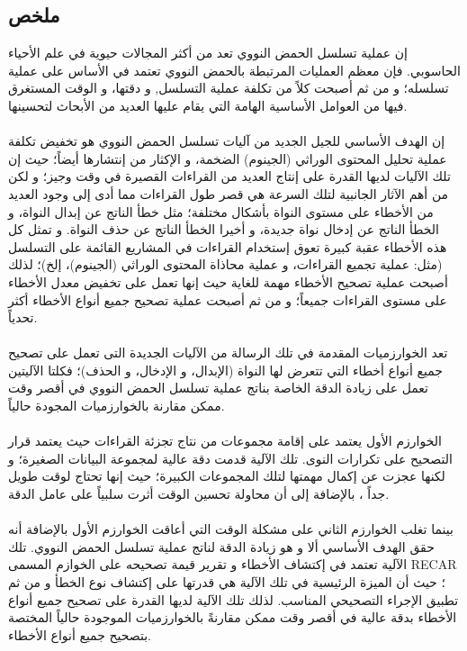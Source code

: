 \documentclass[12pt,openany]{llncs}
\begin{document}
\begin{titlepage}
\section*{ملخص}
إن عملية تسلسل الحمض النووي تعد من أكثر المجالات حيوية في علم الأحياء الحاسوبي. فإن معظم العمليات المرتبطة بالحمض النووي تعتمد في الأساس على عملية تسلسله؛ و من ثم أصبحت كلاً من تكلفة عملية التسلسل, و دقتها، و الوقت المستغرق فيها من العوامل الأساسية الهامة التي يقام عليها العديد من الأبحاث لتحسينها.
\\
\\
إن الهدف الأساسي للجيل الجديد من آليات تسلسل الحمض النووي هو تخفيض تكلفة عملية تحليل المحتوى الوراثي (الجينوم) الضخمة، و الإكثار من إنتشارها أيضاً؛ حيث إن تلك الآليات لديها القدرة على إنتاج العديد من القراءات القصيرة في وقت وجيز؛ و لكن من أهم الآثار الجانبية لتلك السرعة هي قصر طول القراءات مما أدى إلى وجود العديد من الأخطاء على مستوى النواة بأشكال مختلفة؛ مثل خطأ الناتج عن إبدال النواة، و الخطأ الناتج عن إدخال نواة جديدة، و أخيرا الخطأ الناتج عن حذف النواة. و تمثل كل هذه الأخطاء عقبة كبيرة تعوق إستخدام القراءات في المشاريع القائمة على التسلسل (مثل:  عملية تجميع القراءات، و عملية محاذاة المحتوى الوراثي (الجينوم)، إلخ)؛ لذلك أصبحت عملية تصحيح الأخطاء مهمة للغاية حيث إنها تعمل على تخفيض معدل الأخطاء على مستوى القراءات جميعاً؛ و من ثم أصبحت عملية تصحيح جميع أنواع الأخطاء أكثر تحدياً.
\\
\\ 
 تعد الخوارزميات المقدمة في تلك الرسالة من الآليات الجديدة التى تعمل على تصحيح جميع أنواع أخطاء التي تتعرض لها النواة (الإبدال، و الإدخال، و الحذف)؛ فكلتا الآليتين تعمل على زيادة الدقة الخاصة بناتج عملية تسلسل الحمض النووي في أقصر وقت ممكن مقارنة بالخوارزميات المجودة حالياً.
\\
\\
الخوارزم الأول يعتمد على إقامة مجموعات من نتاج تجزئة القراءات حيث يعتمد قرار التصحيح على تكرارات النوى. تلك الآلية قدمت دقة عالية لمجموعة البيانات الصغيرة؛ و لكنها عجزت عن إكمال مهمتها لتلك المجموعات الكبيرة؛ حيث إنها تحتاج لوقت طويل جداً ، بالإضافة إلى أن محاولة تحسين الوقت أثرت سلبياً على عامل الدقة.
\\
\\
 بينما تغلب الخوارزم الثاني على مشكلة الوقت التي أعاقت الخوارزم الأول بالإضافة أنه حقق الهدف الأساسي ألا و هو زيادة الدقة لناتج عملية تسلسل الحمض النووي. تلك الآلية تعتمد في إكتشاف الأخطاء و تقرير قيمة تصحيحه على الخوازم المسمى 
 RECAR 
 ؛ حيث أن الميزة الرئيسية في تلك الآلية هي قدرتها على إكتشاف نوع الخطأ و من ثم تطبيق الإجراء التصحيحي المناسب. لذلك تلك الآلية لديها القدرة على تصحيح جميع أنواع الأخطاء بدقة عالية في أقصر وقت ممكن مقارنةً بالخوارزميات الموجودة حالياً المختصة بتصحيح جميع أنواع الأخطاء.


\end{titlepage}
\end{document}
